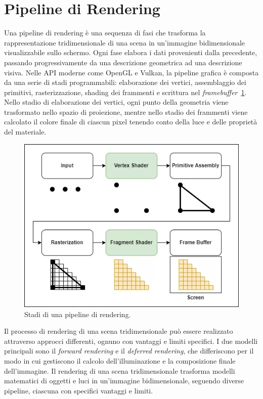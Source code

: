 \documentclass[12pt,a4paper,openright,twoside]{book}
\begin{document}
\section{Pipeline di Rendering}
Una pipeline di rendering è una sequenza di fasi che trasforma la rappresentazione tridimensionale di una scena in
un'immagine bidimensionale visualizzabile sullo schermo. Ogni fase elabora i dati provenienti dalla precedente,
passando progressivamente da una descrizione geometrica ad una descrizione visiva.
Nelle API moderne come OpenGL e Vulkan, la pipeline grafica è composta da una serie di stadi programmabili:
elaborazione dei vertici, assemblaggio dei primitivi, rasterizzazione, shading dei frammenti e scrittura nel
\emph{framebuffer}~\ref{fig:rendering-pipeline-overview}.
Nello stadio di elaborazione dei vertici, ogni punto della geometria viene trasformato nello spazio di proiezione,
mentre nello stadio dei frammenti viene calcolato il colore finale di ciascun pixel tenendo conto della luce e delle
proprietà del materiale.
\begin{figure}[H]
   \centering
   \includegraphics[width=.8\linewidth]{figures/rendering_pipeline_overview.png}
   \caption{Stadi di una pipeline di rendering.}
   \label{fig:rendering-pipeline-overview}
\end{figure}
Il processo di rendering di una scena tridimensionale può essere realizzato attraverso approcci differenti,
ognuno con vantaggi e limiti specifici. I due modelli principali sono il \emph{forward rendering} e il
\emph{deferred rendering}, che differiscono per il modo in cui gestiscono il calcolo dell'illuminazione e la
composizione finale dell'immagine.
Il rendering di una scena tridimensionale trasforma modelli matematici di oggetti e luci in un'immagine bidimensionale,
seguendo diverse pipeline, ciascuna con specifici vantaggi e limiti.
\end{document}
